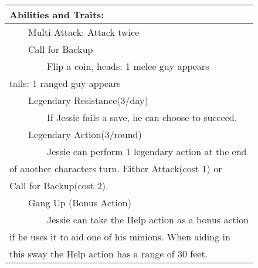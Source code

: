 \documentclass[11pt]{article}
\newcommand{\tabitem}{~~\llap{--}~~}
\newcommand{\tabtabitem}{~~~~~~\llap{$\bullet$}~~}
\begin{document}
\begin{multicols}{2}
\noindent \begin{tabularx}{\linewidth}{@{}l}
{\Large \textbf{Abilities and Traits:}} \\
\hline
\tabitem Multi Attack: Attack twice \\
\tabitem Call for Backup \\
\tabtabitem Flip a coin, heads: 1 melee guy appears \\
tails: 1 ranged guy appears \\
\tabitem Legendary Resistance(3/day) \\
\tabtabitem If Jessie fails a save, he can choose to succeed. \\
\tabitem Legendary Action(3/round) \\
\tabtabitem Jessie can perform 1 legendary action at the end \\
of another characters turn. Either Attack(cost 1) or \\
Call for Backup(cost 2). \\
\tabitem Gang Up (Bonus Action) \\
\tabtabitem Jessie can take the Help action as a bonus action \\
if he uses it to aid one of his minions. When aiding in \\
this sway the Help action has a range of 30 feet.
		\end{tabularx}
	\end{multicols}
\end{document}
